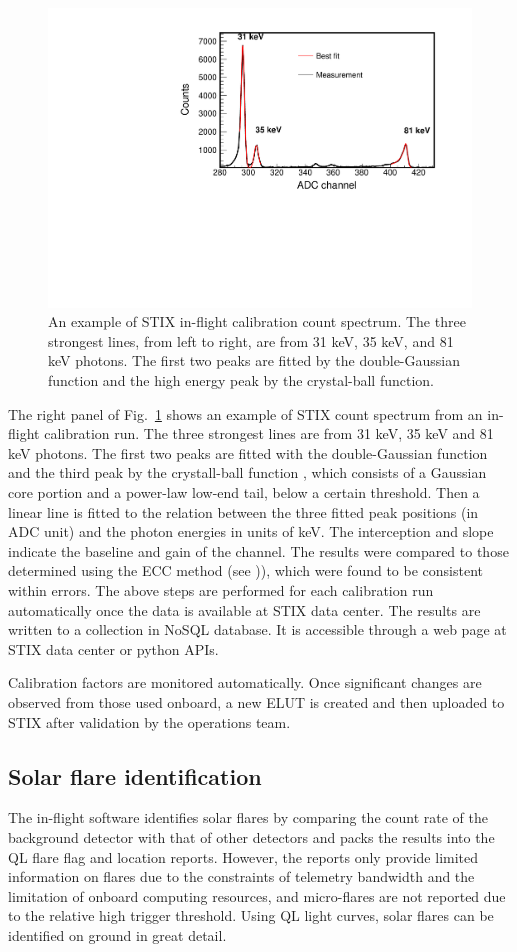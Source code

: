\documentclass[referee]{aa} %
\begin{document}
\begin{figure}
 \centering
  \includegraphics[width=0.8\linewidth]{figures/cal-fit.pdf}
  \caption{ 
   An example of STIX in-flight calibration count spectrum.
  The three strongest lines, from left to right, are from 31 keV, 35 keV, and 81 keV
  photons. The first two peaks are fitted by the double-Gaussian function and the high energy peak by  
  the crystal-ball function. 
}
    \label{fig:cal-fit}
\end{figure}
The right panel of Fig.~\ref{fig:cal-fit} shows 
an example of STIX count spectrum from an in-flight calibration run.  
The three strongest lines are from 31 keV, 35 keV and 81 keV photons. 
The first two peaks are fitted with the double-Gaussian function and the third peak
by the crystall-ball function \cite{crsystallball},  which consists of a Gaussian core portion 
and a power-law low-end tail, below a certain threshold.
Then a linear line is fitted to the relation between
the three fitted peak positions (in ADC unit) and the photon energies in units of keV.  
The interception and slope indicate the baseline and gain of the channel. 
The results were compared to those determined using the ECC method (see \cite{ecc,ecc2})), 
 which were found to be consistent within errors.
The above steps are performed for each calibration run automatically 
once the data is available at STIX data center.  The results are written to a
 collection in  NoSQL database.  It is accessible through a web page at STIX data center or python APIs.

Calibration factors are monitored automatically.
Once significant changes are observed from those used onboard,  a new ELUT is 
created and  then uploaded to STIX after validation by the operations team. 

\subsection{Solar flare identification}
The in-flight software identifies solar flares by comparing  the count rate of 
the background detector with that of other detectors 
 and packs the results into the QL flare flag and location reports.
However,  the reports only provide limited information on flares due to the constraints of telemetry 
bandwidth and the limitation of onboard computing resources, and micro-flares are not 
reported due to the relative high trigger threshold.
Using QL light curves, solar flares can be identified on ground in great detail.
\end{document}
